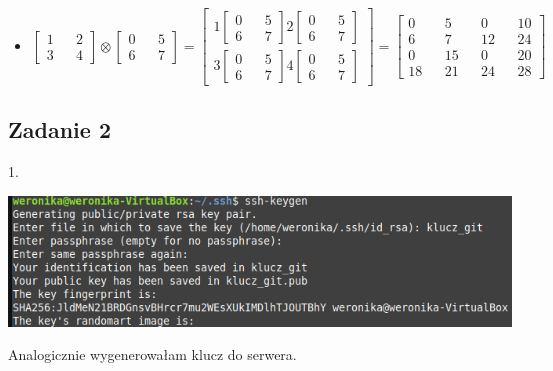 \documentclass[a4paper]{article}
\begin{document}
\begin{itemize}
    \item $\begin{bmatrix}
        1 && 2\\
        3 && 4 
    \end{bmatrix} \otimes 
    \begin{bmatrix}
        0 && 5\\
        6 && 7
    \end{bmatrix} = 
    \begin{bmatrix}
        1 
        \begin{bmatrix}
            0 && 5\\
            6 && 7
        \end{bmatrix} 
        2
        \begin{bmatrix}
            0 && 5\\
            6 && 7
        \end{bmatrix} \\
        3
        \begin{bmatrix}
            0 && 5\\
            6 && 7
        \end{bmatrix} 
        4
        \begin{bmatrix}
            0 && 5\\
            6 && 7
        \end{bmatrix}
    \end{bmatrix} = 
    \begin{bmatrix}
        0 && 5 && 0 && 10\\
        6 && 7 && 12 && 24\\
        0 && 15 && 0 && 20\\
        18 && 21 && 24 && 28  
    \end{bmatrix}$
\end{itemize}

\subsection*{Zadanie 2}
1. 

\begin{center}
    \includegraphics[scale=0.5]{2_1.png}

    \noindent Analogicznie wygenerowałam klucz do serwera.

\end{center}
\end{document}
